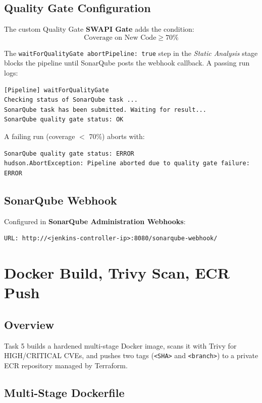 \documentclass[12pt,a4paper]{article}
\begin{document}
\subsection{Quality Gate Configuration}

The custom Quality Gate \textbf{SWAPI Gate} adds the condition:
\[
  \text{Coverage on New Code} \geq 70\%
\]

The \texttt{waitForQualityGate abortPipeline: true} step in the
\textit{Static Analysis} stage blocks the pipeline until SonarQube
posts the webhook callback. A passing run logs:

\begin{verbatim}
[Pipeline] waitForQualityGate
Checking status of SonarQube task ...
SonarQube task has been submitted. Waiting for result...
SonarQube quality gate status: OK
\end{verbatim}

A failing run (coverage $<$ 70\%) aborts with:
\begin{verbatim}
SonarQube quality gate status: ERROR
hudson.AbortException: Pipeline aborted due to quality gate failure: ERROR
\end{verbatim}

\subsection{SonarQube Webhook}

Configured in \textbf{SonarQube Administration \textrightarrow{} Webhooks}:
\begin{verbatim}
URL: http://<jenkins-controller-ip>:8080/sonarqube-webhook/
\end{verbatim}

\newpage
\section{Docker Build, Trivy Scan, ECR Push}

\subsection{Overview}
Task 5 builds a hardened multi-stage Docker image, scans it with Trivy
for HIGH/CRITICAL CVEs, and pushes two tags (\texttt{<SHA>} and \texttt{<branch>})
to a private ECR repository managed by Terraform.

\subsection{Multi-Stage Dockerfile}
\end{document}

